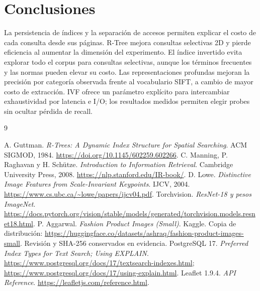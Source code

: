 \documentclass[11pt,a4paper]{article}
\begin{document}
\section{Conclusiones}
La persistencia de índices y la separación de accesos permiten explicar el costo de cada consulta desde sus páginas. R-Tree mejora consultas selectivas 2D y pierde eficiencia al aumentar la dimensión del experimento. El índice invertido evita explorar todo el corpus para consultas selectivas, aunque los términos frecuentes y las normas pueden elevar su costo. Las representaciones profundas mejoran la precisión por categoría observada frente al vocabulario SIFT, a cambio de mayor costo de extracción. IVF ofrece un parámetro explícito para intercambiar exhaustividad por latencia e I/O; los resultados medidos permiten elegir probes sin ocultar pérdida de recall.

\begin{thebibliography}{9}
\raggedright
{} A. Guttman. \emph{R-Trees: A Dynamic Index Structure for Spatial Searching}. ACM SIGMOD, 1984. \url{https://doi.org/10.1145/602259.602266}.
 C. Manning, P. Raghavan y H. Schütze. \emph{Introduction to Information Retrieval}. Cambridge University Press, 2008. \url{https://nlp.stanford.edu/IR-book/}.
 D. Lowe. \emph{Distinctive Image Features from Scale-Invariant Keypoints}. IJCV, 2004. \url{https://www.cs.ubc.ca/~lowe/papers/ijcv04.pdf}.
 Torchvision. \emph{ResNet-18 y pesos ImageNet}. \url{https://docs.pytorch.org/vision/stable/models/generated/torchvision.models.resnet18.html}.
 P. Aggarwal. \emph{Fashion Product Images (Small)}. Kaggle. Copia de distribución: \url{https://huggingface.co/datasets/ashraq/fashion-product-images-small}. Revisión y SHA-256 conservados en evidencia.
 PostgreSQL 17. \emph{Preferred Index Types for Text Search; Using EXPLAIN}. \url{https://www.postgresql.org/docs/17/textsearch-indexes.html}; \url{https://www.postgresql.org/docs/17/using-explain.html}.
 Leaflet 1.9.4. \emph{API Reference}. \url{https://leafletjs.com/reference.html}.
\end{thebibliography}
\end{document}

